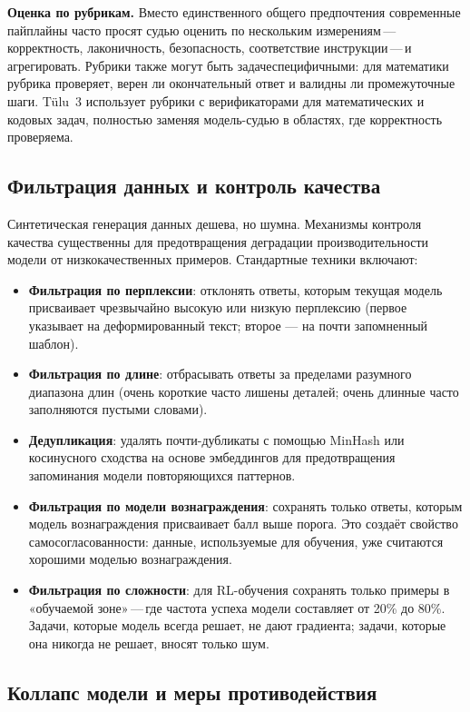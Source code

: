 \textbf{Оценка по рубрикам.} Вместо единственного общего предпочтения современные пайплайны часто просят судью оценить по нескольким измерениям\,---\,корректность, лаконичность, безопасность, соответствие инструкции\,---\,и агрегировать. Рубрики также могут быть задачеспецифичными: для математики рубрика проверяет, верен ли окончательный ответ и валидны ли промежуточные шаги. T\"{u}lu~3 использует рубрики с верификаторами для математических и кодовых задач, полностью заменяя модель-судью в областях, где корректность проверяема.

\subsection{Фильтрация данных и контроль качества}

Синтетическая генерация данных дешева, но шумна. Механизмы контроля качества существенны для предотвращения деградации производительности модели от низкокачественных примеров. Стандартные техники включают:

\begin{itemize}[leftmargin=*]
  \item \textbf{Фильтрация по перплексии}: отклонять ответы, которым текущая модель присваивает чрезвычайно высокую или низкую перплексию (первое указывает на деформированный текст; второе --- на почти запомненный шаблон).
  \item \textbf{Фильтрация по длине}: отбрасывать ответы за пределами разумного диапазона длин (очень короткие часто лишены деталей; очень длинные часто заполняются пустыми словами).
  \item \textbf{Дедупликация}: удалять почти-дубликаты с помощью MinHash или косинусного сходства на основе эмбеддингов для предотвращения запоминания модели повторяющихся паттернов.
  \item \textbf{Фильтрация по модели вознаграждения}: сохранять только ответы, которым модель вознаграждения присваивает балл выше порога. Это создаёт свойство самосогласованности: данные, используемые для обучения, уже считаются хорошими моделью вознаграждения.
  \item \textbf{Фильтрация по сложности}: для RL-обучения сохранять только примеры в «обучаемой зоне»\,---\,где частота успеха модели составляет от 20\% до 80\%. Задачи, которые модель всегда решает, не дают градиента; задачи, которые она никогда не решает, вносят только шум.
\end{itemize}

\subsection{Коллапс модели и меры противодействия}

